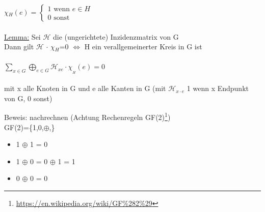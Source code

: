 {\LARGE $\chi$}$_H(e)=
	\begin{cases}
		\text{1 wenn } e \in H\\
		\text{0 sonst}
	\end{cases}
$
\\\\
\underline{Lemma:} Sei $\mathcal{H}$ die (ungerichtete) Inzidenzmatrix von G\\
Dann gilt {\large$\mathcal{H}$} $\cdot$ {\Large $\chi$}$_H$=0 $\Leftrightarrow$ H ein verallgemeinerter Kreis in G ist
\\\\
$\displaystyle \sum \limits_{x \in G} \bigoplus\limits_{e \in G} \mathcal{H}_{x e} \cdot \chi_{_H}(e)=0$\\\\
mit x alle Knoten in G und e alle Kanten in G (mit $\mathcal{H}_{x \cdot e}$ 1 wenn x Endpunkt von G, 0 sonst)

\newpage
Beweis: nachrechnen (Achtung Rechenregeln GF(2)\footnote{\url{https://en.wikipedia.org/wiki/GF\%282\%29}})\\
GF(2)=\{1,0,$\oplus$,\}
\begin{itemize}
	\item 1 $\oplus$ 1 = 0
	\item 1 $\oplus$ 0 = 0 $\oplus$ 1 = 1
	\item 0 $\oplus$ 0 = 0
\end{itemize}

